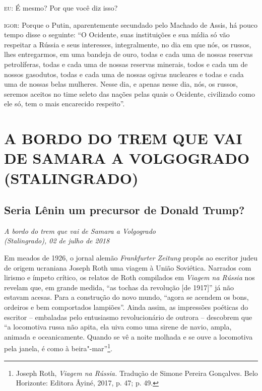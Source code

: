 \textsc{eu:} É mesmo? Por que você diz isso?

\textsc{igor:} Porque o Putin, aparentemente secundado pelo Machado de
Assis, há pouco tempo disse o seguinte: ``O Ocidente, suas instituições
e sua mídia só vão respeitar a Rússia e seus interesses, integralmente,
no dia em que nós, os russos, lhes entregarmos, em uma bandeja de ouro,
todas e cada uma de nossas reservas petrolíferas, todas e cada uma de
nossas reservas minerais, todos e cada um de nossos gasodutos, todas e
cada uma de nossas ogivas nucleares e todas e cada uma de nossas belas
mulheres. Nesse dia, e apenas nesse dia, nós, os russos, seremos aceitos
no time seleto das nações pelas quais o Ocidente, civilizado como ele
só, tem o mais encarecido respeito''.

\clearpage{\pagestyle{empty}\cleardoublepage}
\movetooddpage
{}
\part*{A BORDO DO TREM QUE VAI DE SAMARA A VOLGOGRADO (STALINGRADO)}

\chapter*{Seria Lênin um precursor de Donald Trump?}

\begin{flushright}
\emph{A bordo do trem que vai de Samara a Volgogrado\\(Stalingrado), 02 de julho de 2018}
\end{flushright}

Em meados de 1926, o jornal alemão \emph{Frankfurter Zeitung} propôs ao
escritor judeu de origem ucraniana Joseph Roth uma viagem à União
Soviética. Narrados com lirismo e ímpeto crítico, os relatos de Roth
compilados em \emph{Viagem na Rússia} nos revelam que, em grande medida,
``as tochas da revolução {[}de 1917{]}'' já não estavam acesas. Para a
construção do novo mundo, ``agora se acendem os bons, ordeiros e bem
comportados lampiões''. Ainda assim, as impressões poéticas do escritor
-- embaladas pelo entusiasmo revolucionário de outrora -- descobrem que
``a locomotiva russa não apita, ela uiva como uma sirene de navio,
ampla, animada e oceanicamente. Quando se vê a noite molhada e se ouve a
locomotiva pela janela, é como à beira"-mar''\footnote{Joseph Roth,
  \emph{Viagem na Rússia.} Tradução de Simone Pereira Gonçalves. Belo
  Horizonte: Editora Âyiné, 2017, p. 47; p. 49.}.

